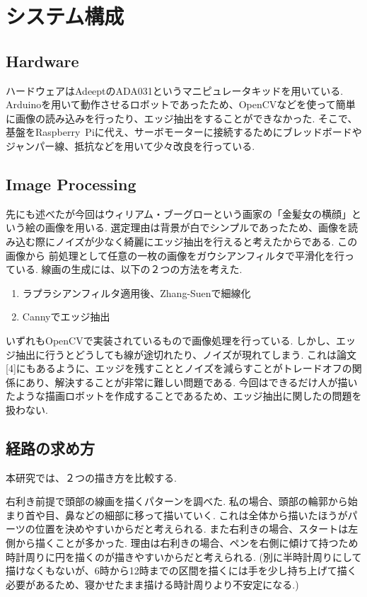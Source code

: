 \documentclass[10pt]{jarticle}
\begin{document}
    \section{システム構成}
	\subsection{Hardware}
	ハードウェアはAdeeptのADA031というマニピュレータキッドを用いている.
	Arduinoを用いて動作させるロボットであったため、OpenCVなどを使って簡単に画像の読み込みを行ったり、エッジ抽出をすることができなかった.
	そこで、基盤をRaspberry\ Piに代え、サーボモーターに接続するためにブレッドボードやジャンパー線、抵抗などを用いて少々改良を行っている.

	\subsection{Image Processing}
	先にも述べたが今回はウィリアム・ブーグローという画家の「金髪女の横顔」という絵の画像を用いる.
	選定理由は背景が白でシンプルであったため、画像を読み込む際にノイズが少なく綺麗にエッジ抽出を行えると考えたからである.
	この画像から
	前処理として任意の一枚の画像をガウシアンフィルタで平滑化を行っている.
	線画の生成には、以下の２つの方法を考えた.
	\begin{enumerate}
		\item ラプラシアンフィルタ適用後、Zhang-Suenで細線化
		\item Cannyでエッジ抽出
	\end{enumerate}
	いずれもOpenCVで実装されているもので画像処理を行っている.
	しかし、エッジ抽出に行うとどうしても線が途切れたり、ノイズが現れてしまう.
	これは論文[4]にもあるように、エッジを残すこととノイズを減らすことがトレードオフの関係にあり、解決することが非常に難しい問題である.
	今回はできるだけ人が描いたような描画ロボットを作成することであるため、エッジ抽出に関したの問題を扱わない.


	
	\subsection{経路の求め方}
	本研究では、２つの描き方を比較する.

	右利き前提で頭部の線画を描くパターンを調べた.
	私の場合、頭部の輪郭から始まり首や目、鼻などの細部に移って描いていく.
	これは全体から描いたほうがパーツの位置を決めやすいからだと考えられる.
	また右利きの場合、スタートは左側から描くことが多かった.
	理由は右利きの場合、ペンを右側に傾けて持つため時計周りに円を描くのが描きやすいからだと考えられる.
	(別に半時計周りにして描けなくもないが、6時から12時までの区間を描くには手を少し持ち上げて描く必要があるため、寝かせたまま描ける時計周りより不安定になる.)
	
\end{document}
